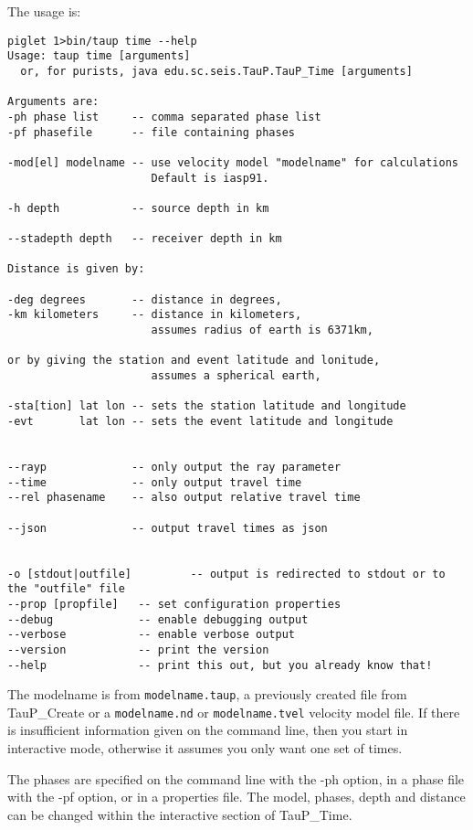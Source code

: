 The usage is:
\begin{verbatim}
piglet 1>bin/taup time --help
Usage: taup time [arguments]
  or, for purists, java edu.sc.seis.TauP.TauP_Time [arguments]

Arguments are:
-ph phase list     -- comma separated phase list
-pf phasefile      -- file containing phases

-mod[el] modelname -- use velocity model "modelname" for calculations
                      Default is iasp91.

-h depth           -- source depth in km

--stadepth depth   -- receiver depth in km

Distance is given by:

-deg degrees       -- distance in degrees,
-km kilometers     -- distance in kilometers,
                      assumes radius of earth is 6371km,

or by giving the station and event latitude and lonitude,
                      assumes a spherical earth,

-sta[tion] lat lon -- sets the station latitude and longitude
-evt       lat lon -- sets the event latitude and longitude


--rayp             -- only output the ray parameter
--time             -- only output travel time
--rel phasename    -- also output relative travel time

--json             -- output travel times as json


-o [stdout|outfile]         -- output is redirected to stdout or to the "outfile" file
--prop [propfile]   -- set configuration properties
--debug             -- enable debugging output
--verbose           -- enable verbose output
--version           -- print the version
--help              -- print this out, but you already know that!
\end{verbatim}

The modelname is from \texttt{modelname.taup}, a previously created file
from TauP\_Create or a \texttt{modelname.nd} or \texttt{modelname.tvel} velocity model file.
If there is insufficient information given on the command line, then you start
in interactive mode, otherwise it assumes you only want one set of times.

The phases are specified on the command line with the -ph option,
in a phase file with the -pf option, or in a properties file.
The model, phases, depth and distance can be changed within the interactive
section of TauP\_Time.

